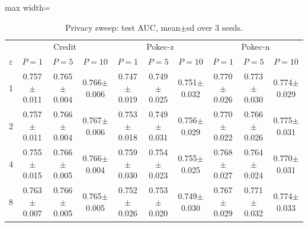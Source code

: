 \begin{table}[tbp]
\centering
\scriptsize
\setlength{\tabcolsep}{3pt}
\caption{Privacy sweep: test AUC, mean$\pm$sd over 3 seeds.}
\label{tab:s_e5auc}
\begin{adjustbox}{max width=\textwidth}
\begin{tabular}{cccccccccc}
\toprule
 & \multicolumn{3}{c}{Credit} & \multicolumn{3}{c}{Pokec-z} & \multicolumn{3}{c}{Pokec-n} \\
$\varepsilon$ & $P=1$ & $P=5$ & $P=10$ & $P=1$ & $P=5$ & $P=10$ & $P=1$ & $P=5$ & $P=10$ \\
\midrule
1 & 0.757$\pm$0.011 & 0.765$\pm$0.004 & 0.766$\pm$0.006 & 0.747$\pm$0.019 & 0.749$\pm$0.025 & 0.751$\pm$0.032 & 0.770$\pm$0.026 & 0.773$\pm$0.030 & 0.774$\pm$0.029 \\
2 & 0.757$\pm$0.011 & 0.766$\pm$0.004 & 0.767$\pm$0.006 & 0.753$\pm$0.018 & 0.749$\pm$0.031 & 0.756$\pm$0.029 & 0.770$\pm$0.022 & 0.766$\pm$0.026 & 0.775$\pm$0.031 \\
4 & 0.755$\pm$0.015 & 0.766$\pm$0.005 & 0.766$\pm$0.004 & 0.759$\pm$0.030 & 0.754$\pm$0.023 & 0.755$\pm$0.025 & 0.768$\pm$0.027 & 0.764$\pm$0.024 & 0.770$\pm$0.031 \\
8 & 0.763$\pm$0.007 & 0.766$\pm$0.005 & 0.765$\pm$0.005 & 0.752$\pm$0.026 & 0.753$\pm$0.020 & 0.749$\pm$0.030 & 0.767$\pm$0.029 & 0.771$\pm$0.032 & 0.774$\pm$0.033 \\
\bottomrule
\end{tabular}
\end{adjustbox}
\end{table}
